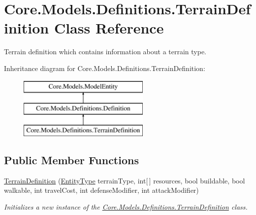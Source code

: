 \hypertarget{classCore_1_1Models_1_1Definitions_1_1TerrainDefinition}{}\section{Core.\+Models.\+Definitions.\+Terrain\+Definition Class Reference}
\label{classCore_1_1Models_1_1Definitions_1_1TerrainDefinition}


Terrain definition which contains information about a terrain type.  


Inheritance diagram for Core.\+Models.\+Definitions.\+Terrain\+Definition\+:\begin{figure}[H]
\begin{center}
\leavevmode
\includegraphics[height=3.000000cm]{classCore_1_1Models_1_1Definitions_1_1TerrainDefinition}
\end{center}
\end{figure}
\subsection*{Public Member Functions}
\begin{DoxyCompactItemize}
\item 
\hyperlink{classCore_1_1Models_1_1Definitions_1_1TerrainDefinition_ad0abe97add8bfffa9e5ddf820c5fc6a6}{Terrain\+Definition} (\hyperlink{namespaceCore_1_1Models_1_1Definitions_a609ed13db028308ebc6c5fbd98615fdc}{Entity\+Type} terrain\+Type, int\mbox{[}$\,$\mbox{]} resources, bool buildable, bool walkable, int travel\+Cost, int defense\+Modifier, int attack\+Modifier)
\begin{DoxyCompactList}\small\item\em Initializes a new instance of the \hyperlink{classCore_1_1Models_1_1Definitions_1_1TerrainDefinition}{Core.\+Models.\+Definitions.\+Terrain\+Definition} class. \end{DoxyCompactList}\end{DoxyCompactItemize}
